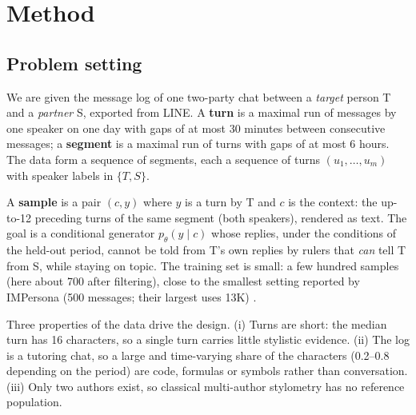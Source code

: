 
\section{Method}
\label{sec:method}

\subsection{Problem setting}
\label{sec:setting}

We are given the message log of one two-party chat between a \emph{target} person T and a \emph{partner} S, exported from LINE.
A \textbf{turn} is a maximal run of messages by one speaker on one day with gaps of at most 30 minutes between consecutive messages; a \textbf{segment} is a maximal run of turns with gaps of at most 6 hours.
The data form a sequence of segments, each a sequence of turns $(u_1, \dots, u_m)$ with speaker labels in $\{T, S\}$.

A \textbf{sample} is a pair $(c, y)$ where $y$ is a turn by T and $c$ is the context: the up-to-12 preceding turns of the same segment (both speakers), rendered as text.
The goal is a conditional generator $p_\theta(y \mid c)$ whose replies, under the conditions of the held-out period, cannot be told from T's own replies by rulers that \emph{can} tell T from S, while staying on topic.
The training set is small: a few hundred samples (here about 700 after filtering), close to the smallest setting reported by IMPersona (500 messages; their largest uses 13K) \citep{shi2025impersona}.

Three properties of the data drive the design.
(i) Turns are short: the median turn has 16 characters, so a single turn carries little stylistic evidence.
(ii) The log is a tutoring chat, so a large and time-varying share of the characters (0.2--0.8 depending on the period) are code, formulas or symbols rather than conversation.
(iii) Only two authors exist, so classical multi-author stylometry has no reference population.

